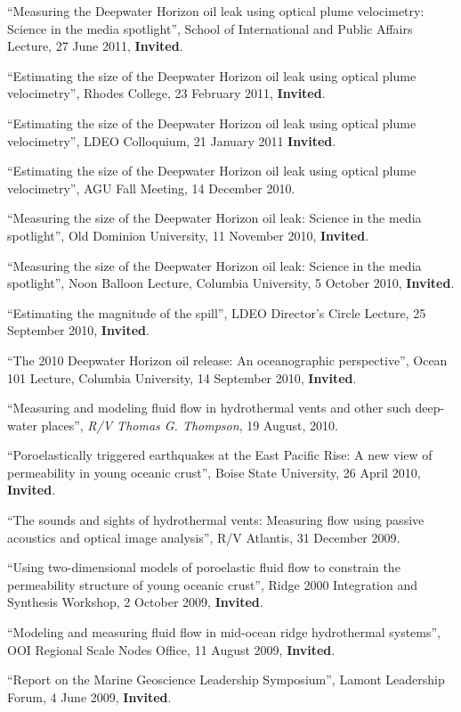 \documentclass[11pt]{res}
\begin{document}
\begin{resume}
``Measuring the Deepwater Horizon oil leak using optical plume velocimetry: Science in the media spotlight'', School of International and Public Affairs Lecture, 27 June 2011, {\bf Invited}.

``Estimating the size of the Deepwater Horizon oil leak using optical plume velocimetry'', Rhodes College, 23 February 2011, {\bf Invited}.

``Estimating the size of the Deepwater Horizon oil leak using optical plume velocimetry'', LDEO Colloquium, 21 January 2011 {\bf Invited}.

``Estimating the size of the Deepwater Horizon oil leak using optical plume velocimetry'', AGU Fall Meeting, 14 December 2010.

``Measuring the size of the Deepwater Horizon oil leak: Science in the media spotlight'', Old Dominion University, 11 November 2010, {\bf Invited}.

``Measuring the size of the Deepwater Horizon oil leak: Science in the media spotlight'', Noon Balloon Lecture, Columbia University, 5 October 2010, {\bf Invited}.

``Estimating the magnitude of the spill'', LDEO Director's Circle Lecture, 25 September 2010, {\bf Invited}.

``The 2010 Deepwater Horizon oil release: An oceanographic perspective'', Ocean 101 Lecture, Columbia University, 14 September 2010, {\bf Invited}.

``Measuring and modeling fluid flow in hydrothermal vents and other such deep-water places'', {\em R/V Thomas G. Thompson}, 19 August, 2010.

``Poroelastically triggered earthquakes at the East Pacific Rise: A new view of permeability in young oceanic crust'', Boise State University, 26 April 2010, {\bf Invited}.

``The sounds and sights of hydrothermal vents: Measuring flow using passive acoustics and optical image analysis'', {\rm R/V Atlantis}, 31 December 2009.

``Using two-dimensional models of poroelastic fluid flow to constrain the permeability structure of young oceanic crust'', Ridge 2000 Integration and Synthesis Workshop, 2 October 2009, {\bf Invited}.

``Modeling and measuring fluid flow in mid-ocean ridge hydrothermal systems'', OOI Regional Scale Nodes Office, 11 August 2009, {\bf Invited}.

``Report on the Marine Geoscience Leadership Symposium'', Lamont Leadership Forum, 4 June 2009, {\bf Invited}.


\end{resume}
\end{document}
